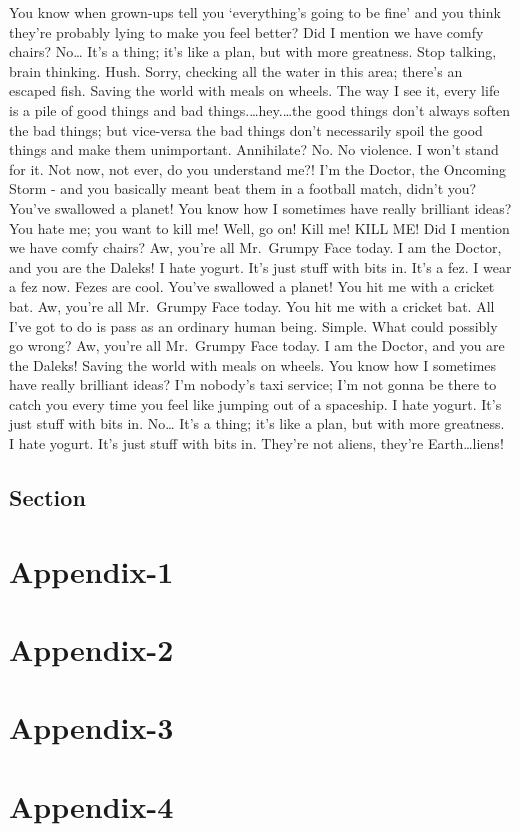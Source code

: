 \documentclass[]{report}
\begin{document}
You know when grown-ups tell you `everything's going to be fine' and you
think they're probably lying to make you feel better? Did I mention we
have comfy chairs? No\ldots{} It's a thing; it's like a plan, but with
more greatness. Stop talking, brain thinking. Hush. Sorry, checking all
the water in this area; there's an escaped fish. Saving the world with
meals on wheels. The way I see it, every life is a pile of good things
and bad things.\ldots{}hey.\ldots{}the good things don't always soften
the bad things; but vice-versa the bad things don't necessarily spoil
the good things and make them unimportant. Annihilate? No. No violence.
I won't stand for it. Not now, not ever, do you understand me?! I'm the
Doctor, the Oncoming Storm - and you basically meant beat them in a
football match, didn't you? You've swallowed a planet! You know how I
sometimes have really brilliant ideas? You hate me; you want to kill me!
Well, go on! Kill me! KILL ME! Did I mention we have comfy chairs? Aw,
you're all Mr.~Grumpy Face today. I am the Doctor, and you are the
Daleks! I hate yogurt. It's just stuff with bits in. It's a fez. I wear
a fez now. Fezes are cool. You've swallowed a planet! You hit me with a
cricket bat. Aw, you're all Mr.~Grumpy Face today. You hit me with a
cricket bat. All I've got to do is pass as an ordinary human being.
Simple. What could possibly go wrong? Aw, you're all Mr.~Grumpy Face
today. I am the Doctor, and you are the Daleks! Saving the world with
meals on wheels. You know how I sometimes have really brilliant ideas?
I'm nobody's taxi service; I'm not gonna be there to catch you every
time you feel like jumping out of a spaceship. I hate yogurt. It's just
stuff with bits in. No\ldots{} It's a thing; it's like a plan, but with
more greatness. I hate yogurt. It's just stuff with bits in. They're not
aliens, they're Earth\ldots{}liens!

\label{chapter-4}

\section{Section}\label{section-4.1}

\chapter[Appendix-1]{Appendix-1}\label{appendix-1}
\chapter[Appendix-2]{Appendix-2}\label{appendix-2}
\chapter[Appendix-3]{Appendix-3}\label{appendix-3}
\chapter[Appendix-4]{Appendix-4}\label{appendix-4}
\end{document}

